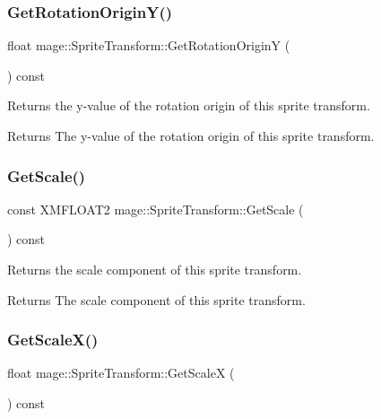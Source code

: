 \subsubsection{\texorpdfstring{Get\+Rotation\+Origin\+Y()}{GetRotationOriginY()}}
{\footnotesize\ttfamily float mage\+::\+Sprite\+Transform\+::\+Get\+Rotation\+OriginY (\begin{DoxyParamCaption}{ }\end{DoxyParamCaption}) const}

Returns the y-\/value of the rotation origin of this sprite transform.

\begin{DoxyReturn}{Returns}
The y-\/value of the rotation origin of this sprite transform. 
\end{DoxyReturn}
\hypertarget{structmage_1_1_sprite_transform_a65674382a140225b7a18b5a26bde23bd}{}\label{structmage_1_1_sprite_transform_a65674382a140225b7a18b5a26bde23bd} 
\subsubsection{\texorpdfstring{Get\+Scale()}{GetScale()}}
{\footnotesize\ttfamily const X\+M\+F\+L\+O\+A\+T2 mage\+::\+Sprite\+Transform\+::\+Get\+Scale (\begin{DoxyParamCaption}{ }\end{DoxyParamCaption}) const}

Returns the scale component of this sprite transform.

\begin{DoxyReturn}{Returns}
The scale component of this sprite transform. 
\end{DoxyReturn}
\hypertarget{structmage_1_1_sprite_transform_ae192203af55097b4e296ce0cb916cd97}{}\label{structmage_1_1_sprite_transform_ae192203af55097b4e296ce0cb916cd97} 
\subsubsection{\texorpdfstring{Get\+Scale\+X()}{GetScaleX()}}
{\footnotesize\ttfamily float mage\+::\+Sprite\+Transform\+::\+Get\+ScaleX (\begin{DoxyParamCaption}{ }\end{DoxyParamCaption}) const}

